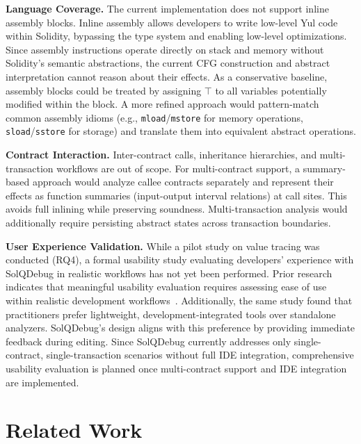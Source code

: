 \documentclass[pdflatex,sn-basic]{sn-jnl}%
\theoremstyle{thmstyleone}%
\theoremstyle{thmstyletwo}%
\theoremstyle{thmstylethree}%
\begin{document}
    \smallskip
    \noindent\textbf{Language Coverage.}
    The current implementation does not support inline assembly blocks.
    Inline assembly allows developers to write low-level Yul code within Solidity, bypassing the type system and enabling low-level optimizations.
    Since assembly instructions operate directly on stack and memory without Solidity's semantic abstractions,
    the current CFG construction and abstract interpretation cannot reason about their effects.
    As a conservative baseline, assembly blocks could be treated by assigning $\top$ to all variables potentially modified within the block.
    A more refined approach would pattern-match common assembly idioms (e.g., \texttt{mload}/\texttt{mstore} for memory operations, \texttt{sload}/\texttt{sstore} for storage)
    and translate them into equivalent abstract operations.

    \smallskip
    \noindent\textbf{Contract Interaction.}
    Inter-contract calls, inheritance hierarchies, and multi-transaction workflows are out of scope.
    For multi-contract support, a summary-based approach would analyze callee contracts separately and represent their effects as function summaries (input-output interval relations) at call sites.
    This avoids full inlining while preserving soundness. Multi-transaction analysis would additionally require persisting abstract states across transaction boundaries.

    \smallskip
    \noindent\textbf{User Experience Validation.}
    While a pilot study on value tracing was conducted (RQ4),
    a formal usability study evaluating developers' experience with SolQDebug in realistic workflows has not yet been performed.
    Prior research indicates that meaningful usability evaluation requires assessing ease of use within realistic development workflows~\citep{defisecurity}.
    Additionally, the same study found that practitioners prefer lightweight, development-integrated tools over standalone analyzers.
    SolQDebug's design aligns with this preference by providing immediate feedback during editing.
    Since SolQDebug currently addresses only single-contract, single-transaction scenarios without full IDE integration,
    comprehensive usability evaluation is planned once multi-contract support and IDE integration are implemented.

\section{Related Work}
\end{document}
